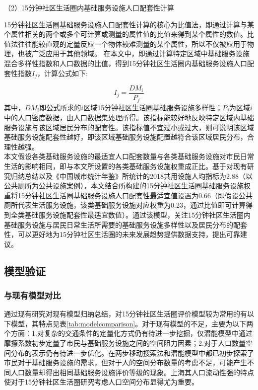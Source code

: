 \documentclass{shnuthesis}
\begin{document}
（2）15分钟社区生活圈内基础服务设施人口配套性计算

15分钟社区生活圈基础服务设施人口配套性计算的核心为比值法，即通过计算与某个属性相关的两个或多个可计算或测量的属性值的比值来得到某个属性的数值。比值法往往能较直观的定量反应一个物体较难测量的某个属性，所以不仅被应用于物理，也被广泛应用于其他领域\textsuperscript{\cite{qu2018}}。
在本文中，即通过计算特定区域中基础服务设施混合多样性指数和人口数据的比值，得到15分钟社区生活圈内基础服务设施人口配套性指数$I_j$，计算公式如下: 

\begin{equation}
	I_{j}=\frac{D M_{i}}{P_{j}}
\end{equation}
\newline
其中，$DM_i$即公式所求的$i$区域15分钟社区生活圈基础服务设施多样性；$P_j$为区域$i$中的人口密度数据，由人口数据集处理所得。该指标能较好地反映特定区域内基础服务设施与该区域居民分布的配套性。该指标值不宜过小或过大，则可说明该区域基础服务设施配套性越好，即该区域基础服务设施配置越符合该区域居民分布，合理性越强。\\
\indent 本文假设各类基础服务设施的最适宜人口配套数量与各类基础服务设施对市民日常生活的影响相同，即与本文所设置的各类基础服务设施权重成正比。基于对现有研究归纳总结以及《中国城市统计年鉴》所统计的2018共用设施人均指标为2.88（以公共厕所为公共设施案例），本文结合所构建的15分钟社区生活圈基础服务设施权重将15分钟社区生活圈基础服务设施人口配套性最适宜值设置为0.66（即假设公共厕所代表生活服务设施，该类基础服务设施对应权重为0.23，通过比值即可计算得到全类基础服务设施配套性最适宜数值）。通过该模型，关注15分钟社区生活圈内基础服务设施与居民日常生活所需要的基础服务设施多样性以及居民分布的配套性，可以更好地为15分钟社区生活圈的未来发展趋势提供数据支持，提出可靠建议。


\subsection{模型验证}

\subsubsection{与现有模型对比}

通过现有研究对现有模型归纳总结，对15分钟社区生活圈评价模型较为常用的有以下模型，其特点见表\ref{tab:modelcomparison}。对于现有模型的不足，主要为以下两个方面：1.对复杂的交通条件的定量化方式仍有待进一步挖掘，仅潜能模型中通过摩擦系数初步定量了市民与基础服务设施之间的空间阻力因素；2.对于人口数量空间分布的表示仍有待进一步优化。在两步移动搜索法和潜能模型中都已初步探索了市民对于基础服务设施的需求，但对于人的空间分布数量的考虑不足，可能产生不同人口数量却得出相同基础服务设施评价等级的现象。上海其人口流动性强的特点使对于15分钟社区生活圈研究考虑人口空间分布显得尤为重要。
\end{document}
